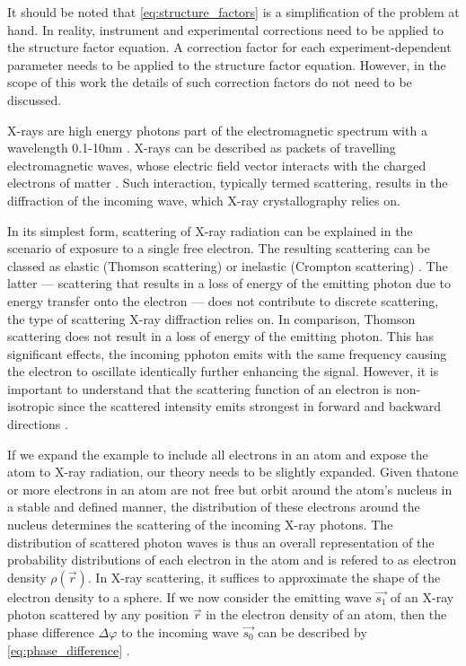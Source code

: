 It should be noted that \cref{eq:structure_factors} is a simplification of the problem at hand. In reality, instrument and experimental corrections need to be applied to the structure factor equation. A correction factor for each experiment-dependent parameter needs to be applied to the structure factor equation. However, in the scope of this work the details of such correction factors do not need to be discussed.


X-rays are high energy photons part of the electromagnetic spectrum with a wavelength 0.1-10nm \cite{Rupp2010-nc}. X-rays can be described as packets of travelling electromagnetic waves, whose electric field vector interacts with the charged electrons of matter \cite{Rupp2010-nc}. Such interaction, typically termed scattering, results in the diffraction of the incoming wave, which X-ray crystallography relies on.

In its simplest form, scattering of X-ray radiation can be explained in the scenario of exposure to a single free electron. The resulting scattering can be classed as elastic (Thomson scattering) or inelastic (Crompton scattering) \cite{Rupp2010-nc}. The latter --- scattering that results in a loss of energy of the emitting photon due to energy transfer onto the electron --- does not contribute to discrete scattering, the type of scattering X-ray diffraction relies on. In comparison, Thomson scattering does not result in a loss of energy of the emitting photon. This has significant effects, the incoming pphoton emits with the same frequency causing the electron to oscillate identically further enhancing the signal. However, it is important to understand that the scattering function of an electron is non-isotropic since the scattered intensity emits strongest in forward and backward directions \cite{Rupp2010-nc}.

If we expand the example to include all electrons in an atom and expose the atom to X-ray radiation, our theory needs to be slightly expanded. Given thatone or more electrons in an atom are not free but orbit around the atom's nucleus in a stable and defined manner, the distribution of these electrons around the nucleus determines the scattering of the incoming X-ray photons. The distribution of scattered photon waves is thus an overall representation of the probability distributions of each electron in the atom and is refered to as electron density $\rho(\vec{r})$. In X-ray scattering, it suffices to approximate the shape of the electron density to a sphere. If we now consider the emitting wave $\vec{s_1}$ of an X-ray photon scattered by any position $\vec{r}$ in the electron density of an atom, then the phase difference $\Delta\varphi$ to the incoming wave $\vec{s_0}$ can be described by \cref{eq:phase_difference} \cite{Rupp2010-nc}. 

